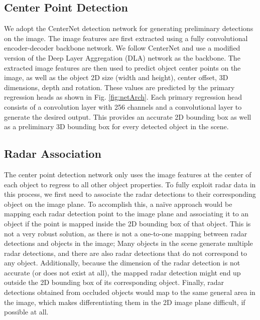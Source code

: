 \documentclass[10pt,twocolumn,letterpaper]{article}
\begin{document}
   \subsection{Center Point Detection}
   We adopt the CenterNet \cite{zhou2019objects} detection network for generating
   preliminary detections on the image. The image features are first extracted 
   using a fully convolutional encoder-decoder backbone network. We follow 
   CenterNet \cite{zhou2019objects} and use a modified version of the Deep Layer
   Aggregation (DLA) network \cite{yuDeepLayerAggregation2018} as the backbone.
   The extracted image features are then used
   to predict object center points on the image, as well as
   the object 2D size (width and height), center offset, 3D dimensions, depth 
   and rotation. These values are predicted by the primary regression heads as shown 
   in Fig. \ref{fig:netArch}. Each primary regression head consists of a  
   convolution layer with 256 channels and a  convolutional layer to 
   generate the desired output. This provides an accurate 2D bounding box as well 
   as a preliminary 3D bounding box for every detected object in the scene.
   
   
   \subsection{Radar Association}
   
   The center point detection network only uses the image features at the center
   of each object to regress to all other object properties.
   To fully exploit radar data in this process, we first need to associate the radar 
   detections to their corresponding object on the image plane. To accomplish 
   this, a na\"{i}ve approach would be mapping each radar detection point to the 
   image plane and associating it to an object if the point is mapped inside 
   the 2D bounding box of that object. This is not a very robust solution, as 
   there is not a one-to-one mapping between radar detections and objects
   in the image; Many objects in the scene generate multiple radar 
   detections, and there are also radar detections that do not correspond to 
   any object.
   Additionally, because the  dimension of the radar detection is not accurate
   (or does not exist at all), the mapped radar detection might end up outside 
   the 2D bounding box of its corresponding object. Finally, radar detections
   obtained from occluded objects would map to the same general area in the 
   image, which makes differentiating them in the 2D image plane difficult, 
   if possible at all. 
   
\end{document}
